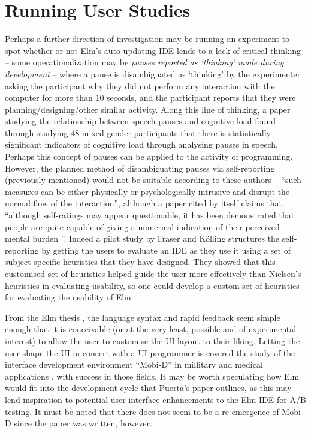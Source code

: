 \documentclass[11pt,openright,a4paper]{report}
\begin{document}
\section{Running User Studies}

Perhaps a further direction of investigation may be running an experiment to
spot whether or not Elm's auto-updating IDE lends to a lack of critical thinking
-- some operationalization may be \textit{pauses reported as `thinking' made
during development} -- where a pause is disambiguated as `thinking' by the
experimenter asking the participant why they did not perform any interaction
with the computer for more than 10 seconds, and the participant reports that
they were planning/designing/other similar activity. Along this line of
thinking, a paper studying the relationship between speech pauses and cognitive
load \cite{Khawaja2008} found through studying 48 mixed gender participants that
there is statistically significant indicators of cognitive load through
analysing pauses in speech. Perhaps this concept of pauses can be applied to the
activity of programming. However, the planned method of disambiguating pauses
via self-reporting (previously mentioned) would not be suitable according to
these authors -- ``such measures can be either physically or psychologically
intrusive and disrupt the normal flow of the interaction'', although a paper
cited by \cite{Khawaja2008} itself claims that ``although self-ratings may
appear questionable, it has been demonstrated that people are quite capable of
giving a numerical indication of their perceived mental burden
\cite{Gopher1984}''. Indeed a pilot study by Fraser and K\"{o}lling
\cite{McKay2012} structures the self-reporting by getting the users to evaluate
an IDE as they use it using a set of subject-specific heuristics that they have
designed. They showed that this customised set of heuristics helped guide the
user more effectively than Nielsen's heuristics in evaluating usability, so one
could develop a custom set of heuristics for evaluating the usability of Elm.

From the Elm thesis \cite{Czaplicki2012elm}, the language syntax and rapid
feedback seem simple enough that it is conceivable (or at the very least,
possible and of experimental interest) to allow the user to customise the UI
layout to their liking. Letting the user shape the UI in concert with a UI
programmer is covered the study of the interface development environment
``Mobi-D'' in millitary and medical applications \cite{Puerta1997}, with success
in those fields. It may be worth speculating how Elm would fit into the
development cycle that Puerta's paper outlines, as this may lend inspiration to
potential user interface enhancements to the Elm IDE for A/B testing. It must be
noted that there does not seem to be a re-emergence of Mobi-D since the paper
was written, however.
\end{document}
